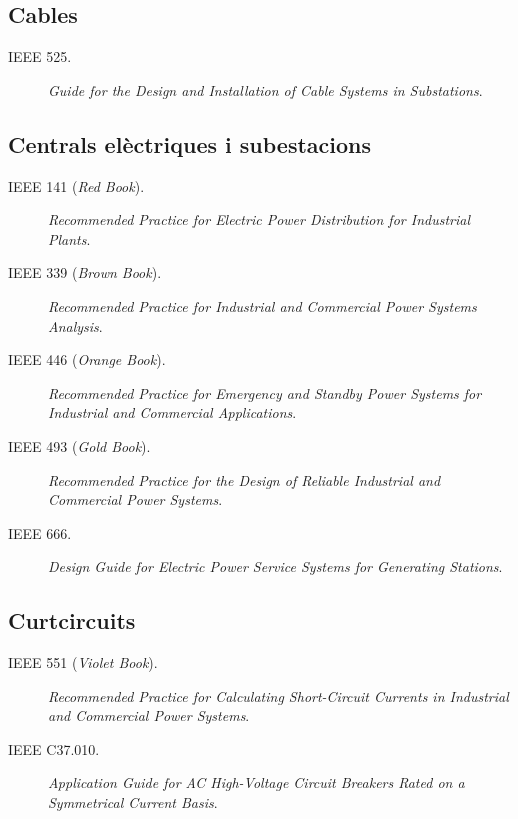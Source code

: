 \subsection*{Cables}
\begin{description}
    \item [\hspace{5mm}IEEE 525.] \textit{Guide for the Design and Installation of Cable Systems in Substations}.
\end{description}

\subsection*{Centrals elèctriques i subestacions}
\begin{description}
    \item [\hspace{5mm}IEEE 141 (\textit{Red Book}).] \textit{Recommended Practice for Electric Power Distribution for Industrial Plants}.
    \item [\hspace{5mm}IEEE 339 (\textit{Brown Book}).] \textit{Recommended Practice for Industrial and Commercial Power Systems Analysis}.
    \item [\hspace{5mm}IEEE 446 (\textit{Orange Book}).] \textit{Recommended Practice for Emergency and Standby Power Systems for Industrial and Commercial Applications}.
    \item [\hspace{5mm}IEEE 493 (\textit{Gold Book}).] \textit{Recommended Practice for the Design of Reliable Industrial and Commercial Power Systems}. 
    \item [\hspace{5mm}IEEE 666.] \textit{Design Guide for Electric Power Service Systems for Generating Stations}.
\end{description}



\subsection*{Curtcircuits}
\begin{description}
    \item [\hspace{5mm}IEEE 551 (\textit{Violet Book}).] \textit{Recommended Practice for Calculating Short-Circuit Currents in Industrial and Commercial Power Systems}.
    \item [\hspace{5mm}IEEE C37.010.] \textit{Application Guide for AC High-Voltage Circuit Breakers Rated on a Symmetrical Current Basis}.
\end{description}

